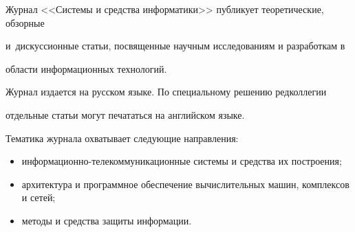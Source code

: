 {\small


{ %

















Журнал <<Системы и средства информатики>> публикует теоретические, обзорные


и~дискуссионные статьи, посвященные научным исследованиям и разработкам в


области информационных технологий.





Журнал издается на русском языке. По специальному решению редколлегии


отдельные статьи могут печататься на английском языке.





\def\leftfootline{\ }


\def\rightfootline{\ }





Тематика журнала охватывает следующие направления:\\[-14pt]





\begin{itemize}


\item  информационно-телекоммуникационные системы и средства их построения;\\[-14pt]


\item архитектура и  программное обеспечение вычислительных машин, комплексов и сетей;\\[-14pt]


\item методы и средства защиты информации.\\[-18pt]



\end{itemize}}}
